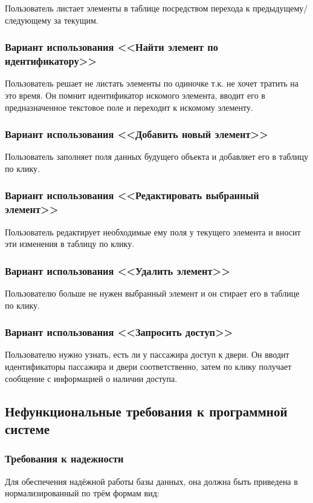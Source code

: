 Пользователь листает элементы в таблице посредством перехода к предыдущему/следующему за текущим.

\subsubsection{Вариант использования <<Найти элемент по идентификатору>>}

Пользователь решает не листать элементы по одиночке т.к. не хочет тратить на это время. Он помнит идентификатор искомого элемента, вводит его в предназначенное текстовое поле и переходит к искомому элементу.

\subsubsection{Вариант использования <<Добавить новый элемент>>}

Пользователь заполняет поля данных будущего объекта и добавляет его в таблицу по клику.

\subsubsection{Вариант использования <<Редактировать выбранный элемент>>}

Пользователь редактирует необходимые ему поля у текущего элемента и вносит эти изменения в таблицу по клику.

\subsubsection{Вариант использования <<Удалить элемент>>}

Пользователю больше не нужен выбранный элемент и он стирает его в таблице по клику.

\subsubsection{Вариант использования <<Запросить доступ>>}

Пользователю нужно узнать, есть ли у пассажира доступ к двери. Он вводит идентификаторы пассажира и двери соответственно, затем по клику получает сообщение с информацией о наличии доступа.

\subsection {Нефункциональные требования к программной системе}
\subsubsection{Требования к надежности}
Для обеспечения надёжной работы базы данных, она должна быть приведена в нормализированный по трём формам вид:


